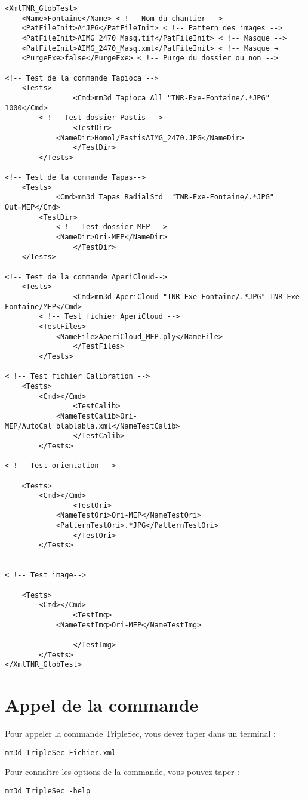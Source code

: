 \documentclass[a4paper]{book}
\begin{document}
\begin{verbatim}
<XmlTNR_GlobTest>
	<Name>Fontaine</Name> < !-- Nom du chantier -->
	<PatFileInit>A*JPG</PatFileInit> < !-- Pattern des images -->
	<PatFileInit>AIMG_2470_Masq.tif</PatFileInit> < !-- Masque -->
	<PatFileInit>AIMG_2470_Masq.xml</PatFileInit> < !-- Masque →
	<PurgeExe>false</PurgeExe> < !-- Purge du dossier ou non -->

<!-- Test de la commande Tapioca -->
	<Tests>
           		<Cmd>mm3d Tapioca All "TNR-Exe-Fontaine/.*JPG" 1000</Cmd>
		< !-- Test dossier Pastis -->
           		<TestDir>
			<NameDir>Homol/PastisAIMG_2470.JPG</NameDir>
           		</TestDir>
     	</Tests> 

<!-- Test de la commande Tapas-->
	<Tests>
     		<Cmd>mm3d Tapas RadialStd  "TNR-Exe-Fontaine/.*JPG" Out=MEP</Cmd>
		<TestDir>
			< !-- Test dossier MEP -->
			<NameDir>Ori-MEP</NameDir>
            	</TestDir>
	</Tests>

<!-- Test de la commande AperiCloud-->
	<Tests>
           		<Cmd>mm3d AperiCloud "TNR-Exe-Fontaine/.*JPG" TNR-Exe-Fontaine/MEP</Cmd>
		< !-- Test fichier AperiCloud -->
		<TestFiles>
			<NameFile>AperiCloud_MEP.ply</NameFile>
           		</TestFiles>
     	</Tests>

< !-- Test fichier Calibration -->
	<Tests>
		<Cmd></Cmd>
           		<TestCalib>
			<NameTestCalib>Ori-MEP/AutoCal_blablabla.xml</NameTestCalib>
           		</TestCalib>
     	</Tests>

< !-- Test orientation -->
     
	<Tests>
		<Cmd></Cmd>
           		<TestOri>
			<NameTestOri>Ori-MEP</NameTestOri>
			<PatternTestOri>.*JPG</PatternTestOri>
           		</TestOri>
    	</Tests>


< !-- Test image-->
     
	<Tests>
		<Cmd></Cmd>
           		<TestImg>
			<NameTestImg>Ori-MEP</NameTestImg>

           		</TestImg>
    	</Tests>
</XmlTNR_GlobTest>
\end{verbatim}

\section{Appel de la commande}
Pour appeler la commande TripleSec, vous devez taper dans un terminal :
\begin{verbatim}
mm3d TripleSec Fichier.xml
\end{verbatim}
Pour connaître les options de la commande, vous pouvez taper :
\begin{verbatim}
mm3d TripleSec -help
\end{verbatim}
\end{document}
